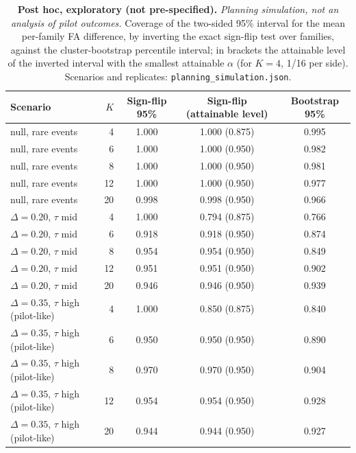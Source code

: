 \begin{table}[t]\centering\footnotesize
\caption{\textbf{Post hoc, exploratory (not pre-specified).} \emph{Planning simulation, not an analysis of pilot outcomes.} Coverage of the two-sided 95\% interval for the mean per-family FA difference, by inverting the exact sign-flip test over families, against the cluster-bootstrap percentile interval; in brackets the attainable level of the inverted interval with the smallest attainable $\alpha$ (for $K=4$, 1/16 per side). Scenarios and replicates: \texttt{planning\_simulation.json}.}\label{tab:plan-coverage}
\begin{tabular}{lrccc}\toprule Scenario & $K$ & Sign-flip 95\% & Sign-flip (attainable level) & Bootstrap 95\% \\\midrule
null, rare events & 4 & 1.000 & 1.000 (0.875) & 0.995 \\
null, rare events & 6 & 1.000 & 1.000 (0.950) & 0.982 \\
null, rare events & 8 & 1.000 & 1.000 (0.950) & 0.981 \\
null, rare events & 12 & 1.000 & 1.000 (0.950) & 0.977 \\
null, rare events & 20 & 0.998 & 0.998 (0.950) & 0.966 \\
$\Delta=0.20$, $\tau$ mid & 4 & 1.000 & 0.794 (0.875) & 0.766 \\
$\Delta=0.20$, $\tau$ mid & 6 & 0.918 & 0.918 (0.950) & 0.874 \\
$\Delta=0.20$, $\tau$ mid & 8 & 0.954 & 0.954 (0.950) & 0.849 \\
$\Delta=0.20$, $\tau$ mid & 12 & 0.951 & 0.951 (0.950) & 0.902 \\
$\Delta=0.20$, $\tau$ mid & 20 & 0.946 & 0.946 (0.950) & 0.939 \\
$\Delta=0.35$, $\tau$ high (pilot-like) & 4 & 1.000 & 0.850 (0.875) & 0.840 \\
$\Delta=0.35$, $\tau$ high (pilot-like) & 6 & 0.950 & 0.950 (0.950) & 0.890 \\
$\Delta=0.35$, $\tau$ high (pilot-like) & 8 & 0.970 & 0.970 (0.950) & 0.904 \\
$\Delta=0.35$, $\tau$ high (pilot-like) & 12 & 0.954 & 0.954 (0.950) & 0.928 \\
$\Delta=0.35$, $\tau$ high (pilot-like) & 20 & 0.944 & 0.944 (0.950) & 0.927 \\
\bottomrule\end{tabular}\end{table}
